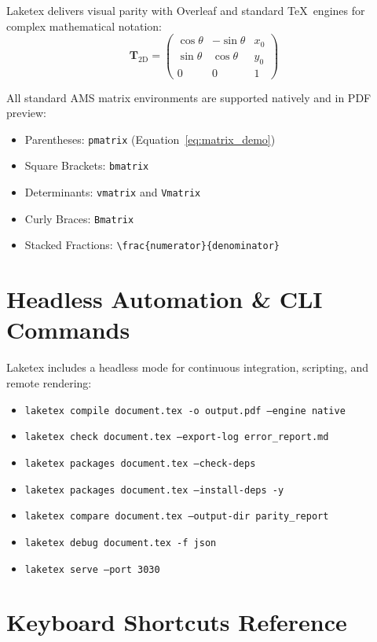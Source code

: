 \documentclass[11pt, a4paper]{article}
\begin{document}
Laketex delivers visual parity with Overleaf and standard \TeX\ engines for complex mathematical notation:
\begin{equation}
\label{eq:matrix_demo}
\mathbf{T}_{2\text{D}} = \begin{pmatrix}
\cos\theta & -\sin\theta & x_0 \\
\sin\theta & \cos\theta & y_0 \\
0 & 0 & 1
\end{pmatrix}
\end{equation}

All standard AMS matrix environments are supported natively and in PDF preview:
\begin{itemize}
    \item Parentheses: \texttt{pmatrix} (Equation~\ref{eq:matrix_demo})
    \item Square Brackets: \texttt{bmatrix}
    \item Determinants: \texttt{vmatrix} and \texttt{Vmatrix}
    \item Curly Braces: \texttt{Bmatrix}
    \item Stacked Fractions: \texttt{\textbackslash frac\{numerator\}\{denominator\}}
\end{itemize}

\section{Headless Automation \& CLI Commands}

Laketex includes a headless mode for continuous integration, scripting, and remote rendering:
\begin{itemize}
    \item \texttt{laketex compile document.tex -o output.pdf --engine native}
    \item \texttt{laketex check document.tex --export-log error\_report.md}
    \item \texttt{laketex packages document.tex --check-deps}
    \item \texttt{laketex packages document.tex --install-deps -y}
    \item \texttt{laketex compare document.tex --output-dir parity\_report}
    \item \texttt{laketex debug document.tex -f json}
    \item \texttt{laketex serve --port 3030}
\end{itemize}

\section{Keyboard Shortcuts Reference}
\end{document}
